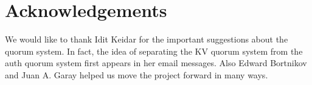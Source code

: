 \section*{Acknowledgements}
We would like to thank Idit Keidar for the important suggestions
about the quorum system. In fact, the idea of separating the KV quorum
system from the auth quorum system first appears in her email
messages. Also Edward Bortnikov and Juan A. Garay helped us move the
project forward in many ways.
